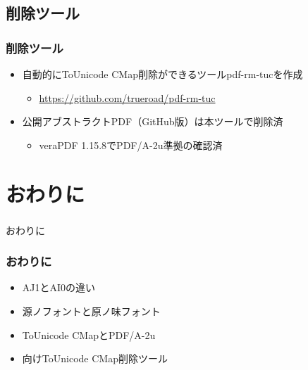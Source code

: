 \subsection{削除ツール}
\begin{frame}\frametitle{削除ツール}
  \begin{itemize}
  \item 自動的にToUnicode CMap削除ができるツールpdf-rm-tucを作成
    \begin{itemize}
      \item \url{https://github.com/trueroad/pdf-rm-tuc}
    \end{itemize}
  \item 公開アブストラクトPDF（GitHub版）は本ツールで削除済
    \begin{itemize}
      \item veraPDF 1.15.8でPDF/A-2u準拠の確認済
    \end{itemize}
  \end{itemize}
\end{frame}

\section{おわりに}
\begin{frame}\frametitle{}
  \centering
  おわりに
\end{frame}

\begin{frame}\frametitle{おわりに}
  \begin{itemize}
  \item AJ1とAI0の違い
  \item 源ノフォントと原ノ味フォント
  \item ToUnicode CMapとPDF/A-2u
  \item \LuaTeX 向けToUnicode CMap削除ツール
  \end{itemize}
\end{frame}


